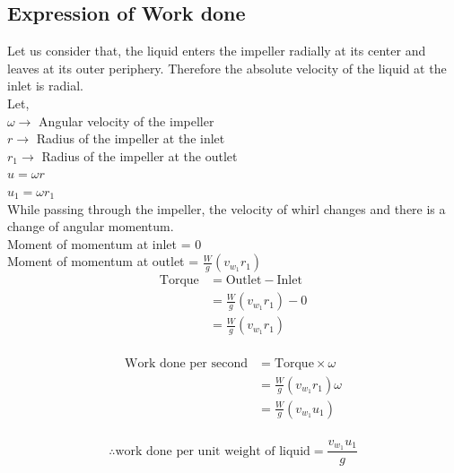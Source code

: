 \documentclass{article}
\begin{document}
  \begin{multicols}{2}
    \subsection*{Expression of Work done}
    Let us consider that, the liquid enters the impeller radially at its center and leaves at its outer periphery. Therefore the absolute velocity of the liquid at the inlet is radial. \\
    Let,\\
    $\omega \rightarrow$ Angular velocity of the impeller \\
    $r \rightarrow$ Radius of the impeller at the inlet \\ 
    $r_1 \rightarrow$ Radius of the impeller at the outlet \\ 
    $u = \omega r$ \\
    $u_1 = \omega r_1$ \\

    While passing through the impeller, the velocity of whirl changes and there is a change of angular momentum. \\

    Moment of momentum at inlet = 0 \\
    Moment of momentum at outlet = $\frac{W}{g} \left(v_{w_{1}} r_1\right) $ \\

    \begin{align*}
      \text{Torque} &= \text{Outlet} - \text{Inlet} \\
      &= \frac{W}{g}\left(v_{w_{1}} r_1\right) - 0 \\
      &= \frac{W}{g}\left(v_{w_{1}} r_1\right) \\
    \end{align*}

    \begin{align*}
      \text{Work done per second} &= \text{Torque} \times \omega \\
      &= \frac{W}{g}\left(v_{w_{1}} r_1\right) \omega \\
      &= \frac{W}{g}\left(v_{w_{1}} u_1\right) \\
    \end{align*}

    \begin{equation}
      \therefore \text{work done per unit weight of liquid} = \frac{v_{w_{1}} u_1}{g} \label{eq:eq55}
    \end{equation}


\end{multicols}
\end{document}
